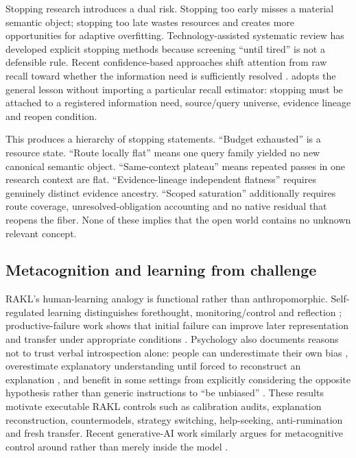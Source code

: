 Stopping research introduces a dual risk. Stopping too early misses a material semantic object; stopping too late wastes resources and creates more opportunities for adaptive overfitting. Technology-assisted systematic review has developed explicit stopping methods because screening ``until tired'' is not a defensible rule. Recent confidence-based approaches shift attention from raw recall toward whether the information need is sufficiently resolved \cite{fletcher2026stopping}. \RAKL{} adopts the general lesson without importing a particular recall estimator: stopping must be attached to a registered information need, source/query universe, evidence lineage and reopen condition.

This produces a hierarchy of stopping statements. ``Budget exhausted'' is a resource state. ``Route locally flat'' means one query family yielded no new canonical semantic object. ``Same-context plateau'' means repeated passes in one research context are flat. ``Evidence-lineage independent flatness'' requires genuinely distinct evidence ancestry. ``Scoped saturation'' additionally requires route coverage, unresolved-obligation accounting and no native residual that reopens the fiber. None of these implies that the open world contains no unknown relevant concept.

\subsection{Metacognition and learning from challenge}
RAKL's human-learning analogy is functional rather than anthropomorphic. Self-regulated learning distinguishes forethought, monitoring/control and reflection \cite{zimmerman2002}; productive-failure work shows that initial failure can improve later representation and transfer under appropriate conditions \cite{kapur2008}. Psychology also documents reasons not to trust verbal introspection alone: people can underestimate their own bias \cite{pronin2002}, overestimate explanatory understanding until forced to reconstruct an explanation \cite{rozenblit2002}, and benefit in some settings from explicitly considering the opposite hypothesis rather than generic instructions to ``be unbiased'' \cite{lord1984}. These results motivate executable RAKL controls such as calibration audits, explanation reconstruction, countermodels, strategy switching, help-seeking, anti-rumination and fresh transfer. Recent generative-AI work similarly argues for metacognitive control around rather than merely inside the model \cite{ji2026}.

